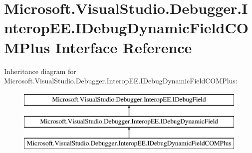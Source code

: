\hypertarget{interface_microsoft_1_1_visual_studio_1_1_debugger_1_1_interop_e_e_1_1_i_debug_dynamic_field_c_o_m_plus}{\section{Microsoft.\+Visual\+Studio.\+Debugger.\+Interop\+E\+E.\+I\+Debug\+Dynamic\+Field\+C\+O\+M\+Plus Interface Reference}
\label{interface_microsoft_1_1_visual_studio_1_1_debugger_1_1_interop_e_e_1_1_i_debug_dynamic_field_c_o_m_plus}
}
Inheritance diagram for Microsoft.\+Visual\+Studio.\+Debugger.\+Interop\+E\+E.\+I\+Debug\+Dynamic\+Field\+C\+O\+M\+Plus\+:\begin{figure}[H]
\begin{center}
\leavevmode
\includegraphics[height=3.000000cm]{interface_microsoft_1_1_visual_studio_1_1_debugger_1_1_interop_e_e_1_1_i_debug_dynamic_field_c_o_m_plus}
\end{center}
\end{figure}
